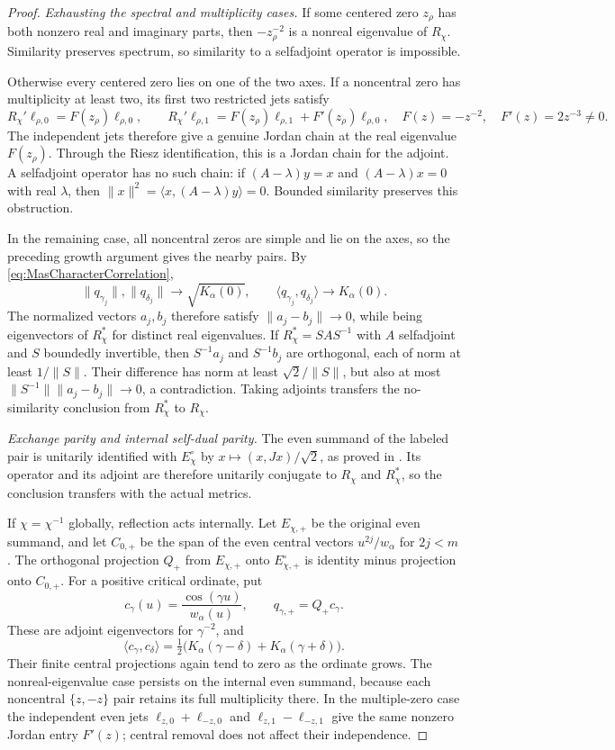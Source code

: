 \begin{proof}
\emph{Exhausting the spectral and multiplicity cases.}
If some centered zero $z_\rho$ has both nonzero real and imaginary parts, then $-z_\rho^{-2}$ is a nonreal eigenvalue of $R_\chi$. Similarity preserves spectrum, so similarity to a selfadjoint operator is impossible.

Otherwise every centered zero lies on one of the two axes. If a noncentral zero has multiplicity at least two, its first two restricted jets satisfy
\[
 R_\chi'\ell_{\rho,0}=F(z_\rho)\ell_{\rho,0},\qquad
 R_\chi'\ell_{\rho,1}=F(z_\rho)\ell_{\rho,1}
                          +F'(z_\rho)\ell_{\rho,0},
 \quad F(z)=-z^{-2},\quad F'(z)=2z^{-3}\ne0.
\]
The independent jets therefore give a genuine Jordan chain at the real eigenvalue $F(z_\rho)$. Through the Riesz identification, this is a Jordan chain for the adjoint. A selfadjoint operator has no such chain: if $(A-\lambda)y=x$ and $(A-\lambda)x=0$ with real $\lambda$, then $\|x\|^2=\langle x,(A-\lambda)y\rangle=0$. Bounded similarity preserves this obstruction.

In the remaining case, all noncentral zeros are simple and lie on the axes, so the preceding growth argument gives the nearby pairs. By \eqref{eq:MasCharacterCorrelation},
\[
 \|q_{\gamma_j}\|,\|q_{\delta_j}\|\to\sqrt{K_\alpha(0)},
 \qquad \langle q_{\gamma_j},q_{\delta_j}\rangle\to K_\alpha(0).
\]
The normalized vectors $a_j,b_j$ therefore satisfy $\|a_j-b_j\|\to0$, while being eigenvectors of $R_\chi^*$ for distinct real eigenvalues.
If $R_\chi^*=SAS^{-1}$ with $A$ selfadjoint and $S$ boundedly invertible, then $S^{-1}a_j$ and $S^{-1}b_j$ are orthogonal, each of norm at least $1/\|S\|$. Their difference has norm at least $\sqrt2/\|S\|$, but also at most $\|S^{-1}\|\|a_j-b_j\|\to0$, a contradiction. Taking adjoints transfers the no-similarity conclusion from $R_\chi^*$ to $R_\chi$.

\emph{Exchange parity and internal self-dual parity.}
The even summand of the labeled pair is unitarily identified with $E_\chi^\circ$ by $x\mapsto(x,Jx)/\sqrt2$, as proved in . Its operator and its adjoint are therefore unitarily conjugate to $R_\chi$ and $R_\chi^*$, so the conclusion transfers with the actual metrics.

If $\chi=\chi^{-1}$ globally, reflection acts internally. Let $E_{\chi,+}$ be the original even summand, and let $C_{0,+}$ be the span of the even central vectors $u^{2j}/w_\alpha$ for $2j<m$. The orthogonal projection $Q_+$ from $E_{\chi,+}$ onto $E_{\chi,+}^\circ$ is identity minus projection onto $C_{0,+}$. For a positive critical ordinate, put
\[
 c_\gamma(u)=\frac{\cos(\gamma u)}{w_\alpha(u)},\qquad
 q_{\gamma,+}=Q_+c_\gamma.
\]
These are adjoint eigenvectors for $\gamma^{-2}$, and
\[
 \langle c_\gamma,c_\delta\rangle
 =\tfrac12\bigl(K_\alpha(\gamma-\delta)+K_\alpha(\gamma+\delta)\bigr).
\]
Their finite central projections again tend to zero as the ordinate grows. The nonreal-eigenvalue case persists on the internal even summand, because each noncentral $\{z,-z\}$ pair retains its full multiplicity there. In the multiple-zero case the independent even jets
$\ell_{z,0}+\ell_{-z,0}$ and $\ell_{z,1}-\ell_{-z,1}$ give the same nonzero Jordan entry $F'(z)$; central removal does not affect their independence.


\end{proof}
